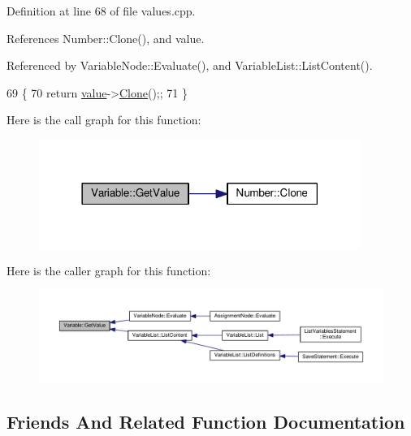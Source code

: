 Definition at line 68 of file values.\+cpp.



References Number\+::\+Clone(), and value.



Referenced by Variable\+Node\+::\+Evaluate(), and Variable\+List\+::\+List\+Content().


\begin{DoxyCode}
69 \{
70     \textcolor{keywordflow}{return} \hyperlink{classVariable_a97f7747dc30797f29b247e26ca585c94}{value}->\hyperlink{structNumber_af59101b8a549616be51212fa1c17785e}{Clone}();;
71 \}
\end{DoxyCode}


Here is the call graph for this function\+:\nopagebreak
\begin{figure}[H]
\begin{center}
\leavevmode
\includegraphics[width=297pt]{classVariable_adb77b2681374245b5d606a1d149d0d91_cgraph}
\end{center}
\end{figure}




Here is the caller graph for this function\+:\nopagebreak
\begin{figure}[H]
\begin{center}
\leavevmode
\includegraphics[width=350pt]{classVariable_adb77b2681374245b5d606a1d149d0d91_icgraph}
\end{center}
\end{figure}




\subsection{Friends And Related Function Documentation}
